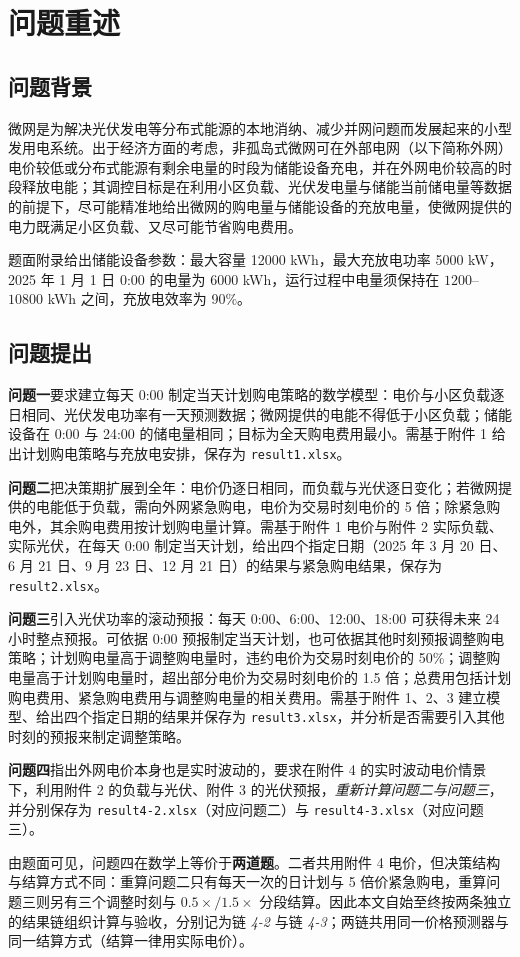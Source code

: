 \section{问题重述}

\subsection{问题背景}

微网是为解决光伏发电等分布式能源的本地消纳、减少并网问题而发展起来的小型发用电系统。出于经济方面的考虑，非孤岛式微网可在外部电网（以下简称外网）电价较低或分布式能源有剩余电量的时段为储能设备充电，并在外网电价较高的时段释放电能；其调控目标是在利用小区负载、光伏发电量与储能当前储电量等数据的前提下，尽可能精准地给出微网的购电量与储能设备的充放电量，使微网提供的电力既满足小区负载、又尽可能节省购电费用。

题面附录给出储能设备参数：最大容量 12000 kWh，最大充放电功率 5000 kW，2025 年 1 月 1 日 0:00 的电量为 6000 kWh，运行过程中电量须保持在 $1200$--$10800$ kWh 之间，充放电效率为 90\%。

\subsection{问题提出}

\textbf{问题一}要求建立每天 0:00 制定当天计划购电策略的数学模型：电价与小区负载逐日相同、光伏发电功率有一天预测数据；微网提供的电能不得低于小区负载；储能设备在 0:00 与 24:00 的储电量相同；目标为全天购电费用最小。需基于附件 1 给出计划购电策略与充放电安排，保存为 \texttt{result1.xlsx}。

\textbf{问题二}把决策期扩展到全年：电价仍逐日相同，而负载与光伏逐日变化；若微网提供的电能低于负载，需向外网紧急购电，电价为交易时刻电价的 5 倍；除紧急购电外，其余购电费用按计划购电量计算。需基于附件 1 电价与附件 2 实际负载、实际光伏，在每天 0:00 制定当天计划，给出四个指定日期（2025 年 3 月 20 日、6 月 21 日、9 月 23 日、12 月 21 日）的结果与紧急购电结果，保存为 \texttt{result2.xlsx}。

\textbf{问题三}引入光伏功率的滚动预报：每天 0:00、6:00、12:00、18:00 可获得未来 24 小时整点预报。可依据 0:00 预报制定当天计划，也可依据其他时刻预报调整购电策略；计划购电量高于调整购电量时，违约电价为交易时刻电价的 50\%；调整购电量高于计划购电量时，超出部分电价为交易时刻电价的 1.5 倍；总费用包括计划购电费用、紧急购电费用与调整购电量的相关费用。需基于附件 1、2、3 建立模型、给出四个指定日期的结果并保存为 \texttt{result3.xlsx}，并分析是否需要引入其他时刻的预报来制定调整策略。

\textbf{问题四}指出外网电价本身也是实时波动的，要求在附件 4 的实时波动电价情景下，利用附件 2 的负载与光伏、附件 3 的光伏预报，\emph{重新计算问题二与问题三}，并分别保存为 \texttt{result4-2.xlsx}（对应问题二）与 \texttt{result4-3.xlsx}（对应问题三）。

由题面可见，问题四在数学上等价于\textbf{两道题}。二者共用附件 4 电价，但决策结构与结算方式不同：重算问题二只有每天一次的日计划与 5 倍价紧急购电，重算问题三则另有三个调整时刻与 $0.5\times/1.5\times$ 分段结算。因此本文自始至终按两条独立的结果链组织计算与验收，分别记为链 \emph{4-2} 与链 \emph{4-3}；两链共用同一价格预测器与同一结算方式（结算一律用实际电价）。
